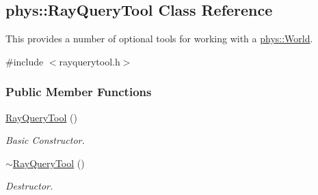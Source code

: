 \hypertarget{classphys_1_1RayQueryTool}{
\subsection{phys::RayQueryTool Class Reference}
\label{d8/d1e/classphys_1_1RayQueryTool}
}


This provides a number of optional tools for working with a \hyperlink{classphys_1_1World}{phys::World}.  




{\ttfamily \#include $<$rayquerytool.h$>$}

\subsubsection*{Public Member Functions}
\begin{DoxyCompactItemize}
\item 
\hyperlink{classphys_1_1RayQueryTool_a84d018a05dfa069066a22ce8a20b43ec}{RayQueryTool} ()
\begin{DoxyCompactList}\small\item\em Basic Constructor. \item\end{DoxyCompactList}\item 
\hyperlink{classphys_1_1RayQueryTool_aef5f45a61870962a556a0a65f4a7080f}{$\sim$RayQueryTool} ()
\begin{DoxyCompactList}\small\item\em Destructor. \item\end{DoxyCompactList}\end{DoxyCompactItemize}
